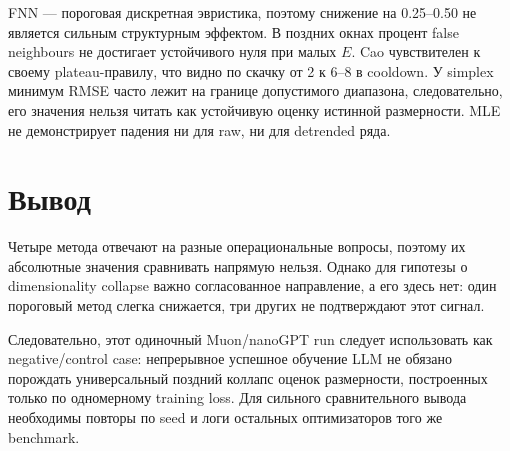 \documentclass[11pt,a4paper]{article}
\begin{document}
FNN --- пороговая дискретная эвристика, поэтому снижение на 0.25--0.50 не
является сильным структурным эффектом. В поздних окнах процент false neighbours
не достигает устойчивого нуля при малых $E$. Cao чувствителен к своему
plateau-правилу, что видно по скачку от 2 к 6--8 в cooldown. У simplex минимум
RMSE часто лежит на границе допустимого диапазона, следовательно, его значения
нельзя читать как устойчивую оценку истинной размерности. MLE не демонстрирует
падения ни для raw, ни для detrended ряда.

\section{Вывод}

Четыре метода отвечают на разные операциональные вопросы, поэтому их
абсолютные значения сравнивать напрямую нельзя. Однако для гипотезы о
dimensionality collapse важно согласованное направление, а его здесь нет: один
пороговый метод слегка снижается, три других не подтверждают этот сигнал.

Следовательно, этот одиночный Muon/nanoGPT run следует использовать как
negative/control case: непрерывное успешное обучение LLM не обязано порождать
универсальный поздний коллапс оценок размерности, построенных только по
одномерному training loss. Для сильного сравнительного вывода необходимы
повторы по seed и логи остальных оптимизаторов того же benchmark.
\end{document}
